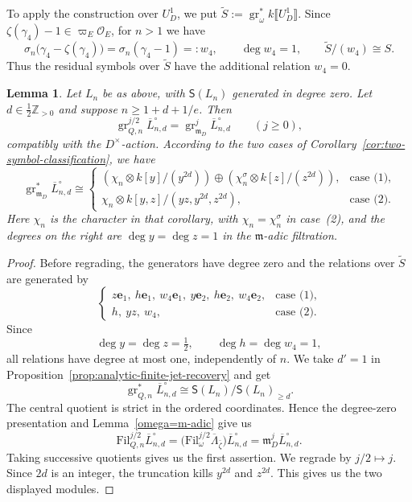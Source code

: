 \documentclass[11pt]{article}
\newtheorem{lemma}[theorem]{Lemma}
\theoremstyle{definition}
\newcommand{\cO}{\mathcal O}
\newcommand{\mD}{\mathfrak m_D}
\newcommand{\gr}{\operatorname{gr}}
\begin{document}
To apply the construction over $U_D^1$, we put
$\widetilde S:=\gr_\omega^*k\llbracket U_D^1\rrbracket$.
Since $\zeta(\gamma_4)-1\in\varpi_E\cO_E$, for $n>1$ we have
\[
 \sigma_n\bigl(\gamma_4-\zeta(\gamma_4)\bigr)
 =\sigma_n(\gamma_4-1)=:w_4,\qquad
 \deg w_4=1,\qquad \widetilde S/(w_4)\cong S.
\]
Thus the residual symbols over $\widetilde S$ have the additional
relation $w_4=0$.

\begin{lemma}\label{lem:two-symbol-truncation}
Let $L_n$ be as above, with $\mathsf S(L_n)$ generated in degree
zero. Let $d\in\tfrac12\mathbb Z_{>0}$ and suppose
$n\geq1+d+1/e$. Then
\[
 \gr_{Q,n}^{j/2}\overline L_{n,d}^{\circ}
 =\gr_{\mD}^{j}\overline L_{n,d}^{\circ}\qquad(j\geq0),
\]
compatibly with the $D^\times$-action. According to the two cases of
Corollary~\ref{cor:two-symbol-classification}, we have
\[
 \gr_{\mD}^*\overline L_{n,d}^\circ\cong
 \begin{cases}
 (\chi_n\otimes k[y]/(y^{2d}))\oplus
 (\chi_n^\sigma\otimes k[z]/(z^{2d})),&\text{case (1)},\\
 \chi_n\otimes k[y,z]/(yz,y^{2d},z^{2d}),&\text{case (2)}.
 \end{cases}
\]
Here $\chi_n$ is the character in that corollary, with
$\chi_n=\chi_n^\sigma$ in case~\textup{(2)}, and the degrees on the
right are $\deg y=\deg z=1$ in the $\mathfrak{m}$-adic filtration.
\end{lemma}
\begin{proof}
Before regrading, the generators have degree zero and the
relations over $\widetilde S$ are generated by
\[
 \begin{cases}
 z\mathbf e_1,\ h\mathbf e_1,\ w_4\mathbf e_1,
 \ y\mathbf e_2,\ h\mathbf e_2,\ w_4\mathbf e_2,&\text{case (1)},\\
 h,\ yz,\ w_4,&\text{case (2)}.
 \end{cases}
\]
Since
\[
 \deg y=\deg z=\tfrac12,\qquad \deg h=\deg w_4=1,
\]
all relations have degree at most one, independently of $n$. We take
$d'=1$ in Proposition~\ref{prop:analytic-finite-jet-recovery} and get
\[
 \gr_{Q,n}^*\overline L_{n,d}^\circ
 \cong\mathsf S(L_n)/\mathsf S(L_n)_{\geq d}.
\]
The central quotient is strict in the ordered coordinates. Hence the
degree-zero presentation and Lemma~\ref{omega=m-adic} give us
\[
 \mathrm{Fil}_{Q,n}^{j/2}\overline L_{n,d}^{\circ}
 =\bigl(\mathrm{Fil}_\omega^{j/2}\overline\Lambda_{\bar\zeta}\bigr)
   \overline L_{n,d}^{\circ}
 =\mD^j\overline L_{n,d}^{\circ}.
\]
Taking successive quotients gives us the first assertion. We regrade by
$j/2\mapsto j$. Since $2d$ is an integer, the truncation kills
$y^{2d}$ and $z^{2d}$. This gives us the two displayed modules.
\end{proof}
\end{document}
